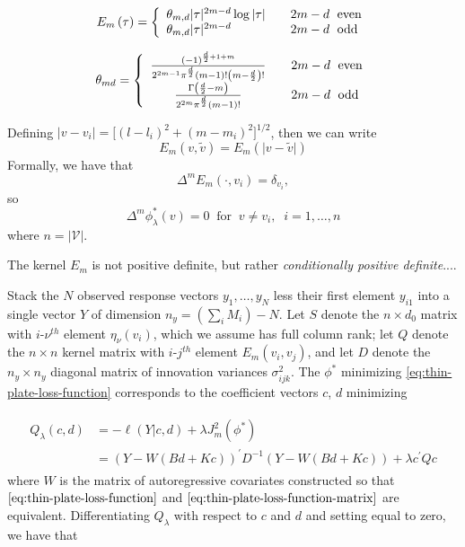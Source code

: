 \documentclass[12pt]{article}
\theoremstyle{definition}
\begin{document}
\begin{align} \label{eq:thin-plate-pseudo-kernel-1}
E_m\left( \tau \right) = \left \{ \begin{array}{ll}   \theta_{m,d} \vert \tau \vert^{2m-d}\log \vert \tau \vert  &  \quad 2m-d \mbox{\; even} \\
					   \theta_{m,d} \vert \tau \vert^{2m-d}& \quad 2m-d \mbox{\; odd} \end{array} \right.
\end{align}

\begin{align} \label{eq:thin-plate-pseudo-kernel-2}
\theta_{md} = \left \{ \begin{array}{cl}   \frac{ \left( -1 \right)^{\frac{d}{2} + 1 + m} }{ 2^{2m-1}\pi^{\frac{d}{2}}\left(m-1\right)! \left( m - \frac{d}{2} \right)! }   & \quad 2m-d \mbox{\; even} \\
					   \frac{ \Gamma\left( \frac{d}{2} - m\right) }{ 2^{2m}\pi^{\frac{d}{2}}\left(m-1\right)! }    & \quad 2m-d \mbox{\; odd} \end{array} \right.
\end{align}

Defining $\vert v - v_i \vert = \bigg[ \left( l - l_i \right)^2 + \left( m - m_i \right)^2  \bigg]^{1/2}$, then we can write 
\[
E_m\left( v,\tilde{v} \right) = E_m\left(\vert v-\tilde{v} \vert \right) 
\]
\noindent
Formally, we have that 
\[
\Delta^m E_m\left( \cdot,v_i \right) = \delta_{v_i}, 
\]
so 
\[
\Delta^m \phi^*_\lambda \left( v \right) = 0 \;\; \mbox{for}\;\;v \ne v_i, \;\;i=1,\dots, n 
\]
\noindent
where $n = \vert \mathcal{V} \vert$.

\bigskip
The kernel $E_m$ is not positive definite, but rather \emph{conditionally positive definite}....


Stack the $N$ observed response vectors $y_1,\dots, y_N$ less their first element $y_{i1}$ into a single vector $Y$ of dimension $n_y=\left(\sum \limits_{i} M_i \right) - N$.  Let $S$ denote the $n \times d_0$ matrix with $i$-$\nu^{th}$ element $\eta_\nu\left(v_i\right)$, which we assume has full column rank; let $Q$ denote the $n \times n$ kernel matrix with $i$-$j^{th}$ element $E_m\left(v_i, v_j\right)$, and let $D$ denote the $n_y \times n_y$ diagonal matrix of innovation variances $\sigma^2_{ijk}$. The $\phi^*$ minimizing \ref{eq:thin-plate-loss-function} corresponds to the coefficient vectors $c$, $d$ minimizing

\begin{align}
\begin{split} \label{eq:thin-plate-loss-function-matrix} 
Q_\lambda\left(c,d\right) &= -\ell\left(Y \vert c,d\right) + \lambda J_m^2\left(\phi^*\right) \\
&= \left( Y - W \left( Bd + Kc \right) \right)^\prime D^{-1} \left( Y - W \left( Bd + Kc \right) \right) + \lambda c^\prime Q c 
\end{split}
\end{align} 
\bigskip
\noindent
 where $W$ is the matrix of autoregressive covariates constructed so that $\ref{eq:thin-plate-loss-function}$ and $\ref{eq:thin-plate-loss-function-matrix}$ are equivalent. 
\bigskip
Differentiating $Q_\lambda$ with respect to $c$ and $d$ and setting equal to zero, we have that 
\end{document}
